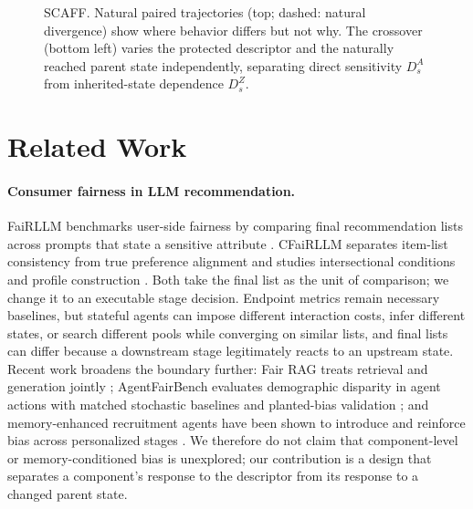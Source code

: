 \documentclass[runningheads]{llncs}
\newcommand{\doagent}{\operatorname{do}_{\mathrm{agent}}}
\begin{document}
\begin{figure}[t]
\caption{SCAFF. Natural paired trajectories (top; dashed: natural divergence) show where
behavior differs but not why. The crossover (bottom left) varies the protected descriptor and
the naturally reached parent state independently, separating direct sensitivity $D_s^A$ from
inherited-state dependence $D_s^Z$.}
\label{fig:overview}
\end{figure}

\section{Related Work}
\label{sec:related}

\paragraph{Consumer fairness in LLM recommendation.}
FaiRLLM benchmarks user-side fairness by comparing final recommendation lists across prompts
that state a sensitive attribute \cite{zhang2023fairrec}. CFaiRLLM separates item-list consistency from
true preference alignment and studies intersectional conditions and profile construction
\cite{deldjoo2025cfairllm}. Both take the final list as the unit of comparison; we change it to an
executable stage decision. Endpoint metrics remain necessary baselines, but stateful agents can
impose different interaction costs, infer different states, or search different pools while
converging on similar lists, and final lists can differ because a downstream stage legitimately
reacts to an upstream state. Recent work broadens the boundary further: Fair RAG treats retrieval
and generation jointly \cite{haque2026fairrag}; Agent\-Fair\-Bench evaluates demographic disparity in
agent actions with matched stochastic baselines and planted-bias validation
\cite{morla2026agentfairbench}; and memory-enhanced recruitment agents have been shown to
introduce and reinforce bias across personalized stages \cite{gharat2025personalization}. We
therefore do not claim that component-level or memory-conditioned bias is unexplored; our
contribution is a design that separates a component's response to the descriptor from its
response to a changed parent state.
\end{document}
